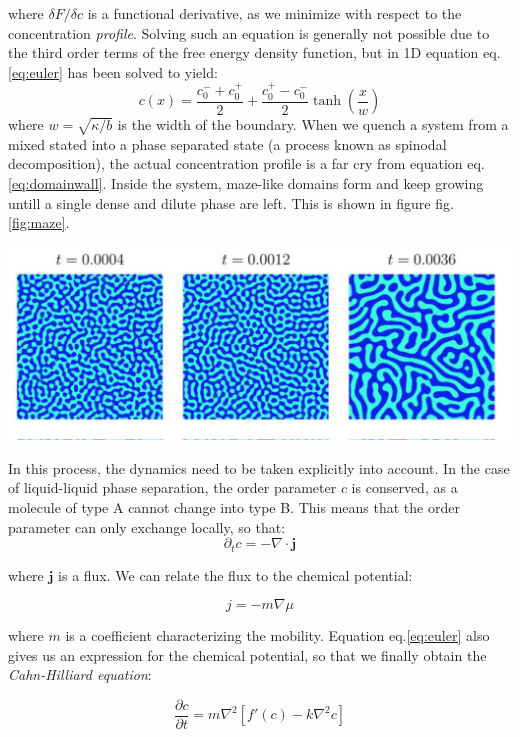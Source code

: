 \documentclass{Dissertate}
\let\origfigure\figure
\let\endorigfigure\endfigure
\renewenvironment{figure}[1][2] {
    \expandafter\origfigure\expandafter[H]
} {
    \endorigfigure
}
\begin{document}
where \(\delta F/\delta c\) is a functional derivative, as we minimize
with respect to the concentration \emph{profile}. Solving such an
equation is generally not possible due to the third order terms of the
free energy density function, but in 1D equation eq.\ref{eq:euler} has
been solved to yield: \begin{equation}
c(x) = \frac{c_0^-+c_0^+}{2}+\frac{c_0^+-c_0^-}{2}\tanh\left(\frac{x}{w}\right)
\label{eq:domainwall}\end{equation} where \(w=\sqrt{\kappa/b}\) is the
width of the boundary. When we quench a system from a mixed stated into
a phase separated state (a process known as spinodal decomposition), the
actual concentration profile is a far cry from equation
eq.\ref{eq:domainwall}. Inside the system, maze-like domains form and
keep growing untill a single dense and dilute phase are left. This is
shown in figure fig.\ref{fig:maze}.

\begin{figure}
\hypertarget{fig:maze}{%
\centering
\includegraphics{source/figures/png/CahnHilliard.png}
\caption{Cahn hilliard domains}\label{fig:maze}
}
\end{figure}

In this process, the dynamics need to be taken explicitly into account.
In the case of liquid-liquid phase separation, the order parameter \(c\)
is conserved, as a molecule of type A cannot change into type B. This
means that the order parameter can only exchange locally, so that: \[
\partial_t c = -\nabla \cdot \mathbf{j}
\]

where \(\mathbf{j}\) is a flux. We can relate the flux to the chemical
potential:

\[
j = -m \nabla \mu
\]

where \(m\) is a coefficient characterizing the mobility. Equation
eq.\ref{eq:euler} also gives us an expression for the chemical
potential, so that we finally obtain the \emph{Cahn-Hilliard equation}:

\[
\frac{\partial c}{\partial t}=m\nabla^2[f'(c)-k\nabla^2c]
\]
\end{document}
